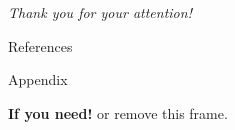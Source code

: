 \documentclass[8pt, aspectratio=169]{beamer} %
\begin{document}


\section{}
\begin{frame}{}
    \centering \Large
    \emph{Thank you for your attention!}
\end{frame}

\begin{frame}[allowframebreaks]{References}

  
  

\end{frame}

\begin{frame}{Appendix}
  
  \textbf{If you need!} or remove this frame.

\end{frame}
\end{document}
